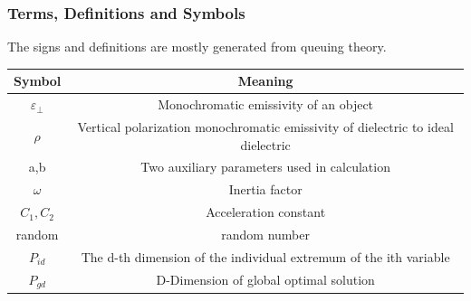 \documentclass{apmcmthesis}
\begin{document}
\subsubsection{Terms, Definitions and Symbols}
The signs and definitions are mostly generated from queuing theory.
\begin{table}[h!]
  \begin{center}
    \begin{tabular}{c|c} 
      \textbf{Symbol} & \textbf{Meaning}\\
      \hline
      ${\varepsilon_{\bot}}$ & Monochromatic emissivity of an object\\
      ${\rho}$ & Vertical polarization monochromatic emissivity of dielectric to ideal dielectric\\
      a,b & Two auxiliary parameters used in calculation\\
      ${\omega}$ & Inertia factor\\
      ${C_{1},C_{2}}$ & Acceleration constant\\
      random & random number\\
      ${P_{id}}$ & The d-th dimension of the individual extremum of the ith variable\\
      ${P_{gd}}$ & D-Dimension of global optimal solution\\
    \end{tabular}
  \end{center}
\end{table}
\end{document}
